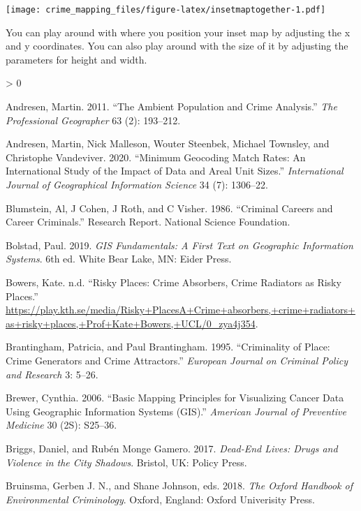 \documentclass[
]{book}
\newlength{\cslhangindent}
\newenvironment{CSLReferences}[2] %
 {%
  \setlength{\parindent}{0pt}
  \ifodd #1 \everypar{\setlength{\hangindent}{\cslhangindent}}\ignorespaces\fi
  \ifnum #2 > 0
  \setlength{\parskip}{#2\baselineskip}
  \fi
 }%
 {}
\begin{document}
\texttt{[image: crime\_mapping\_files/figure-latex/insetmaptogether-1.pdf]}

You can play around with where you position your inset map by adjusting the x and y coordinates. You can also play around with the size of it by adjusting the parameters for height and width.

\hypertarget{refs}{}
\begin{CSLReferences}{1}{0}
\leavevmode\hypertarget{ref-Andresen_2011}{}%
Andresen, Martin. 2011. {``The Ambient Population and Crime Analysis.''} \emph{The Professional Geographer} 63 (2): 193--212.

\leavevmode\hypertarget{ref-Andresen_2020}{}%
Andresen, Martin, Nick Malleson, Wouter Steenbek, Michael Townsley, and Christophe Vandeviver. 2020. {``Minimum Geocoding Match Rates: An International Study of the Impact of Data and Areal Unit Sizes.''} \emph{International Journal of Geographical Information Science} 34 (7): 1306--22.

\leavevmode\hypertarget{ref-Blumstein_1986}{}%
Blumstein, Al, J Cohen, J Roth, and C Visher. 1986. {``Criminal Careers and Career Criminals.''} Research Report. National Science Foundation.

\leavevmode\hypertarget{ref-Bolstad_2019}{}%
Bolstad, Paul. 2019. \emph{GIS Fundamentals: A First Text on Geographic Information Systems}. 6th ed. White Bear Lake, MN: Eider Press.

\leavevmode\hypertarget{ref-Bowers_2021}{}%
Bowers, Kate. n.d. {``Risky Places: Crime Absorbers, Crime Radiators as Risky Places.''} \url{https://play.kth.se/media/Risky+PlacesA+Crime+absorbers,+crime+radiators+as+risky+places,+Prof+Kate+Bowers,+UCL/0_zya4j354}.

\leavevmode\hypertarget{ref-Brantingham_1995}{}%
Brantingham, Patricia, and Paul Brantingham. 1995. {``Criminality of Place: Crime Generators and Crime Attractors.''} \emph{European Journal on Criminal Policy and Research} 3: 5--26.

\leavevmode\hypertarget{ref-Brewer_2006}{}%
Brewer, Cynthia. 2006. {``Basic Mapping Principles for Visualizing Cancer Data Using Geographic Information Systems (GIS).''} \emph{American Journal of Preventive Medicine} 30 (2S): S25--36.

\leavevmode\hypertarget{ref-Briggs_2017}{}%
Briggs, Daniel, and Rubén Monge Gamero. 2017. \emph{Dead-End Lives: Drugs and Violence in the City Shadows}. Bristol, UK: Policy Press.

\leavevmode\hypertarget{ref-Bruinsma_2018}{}%
Bruinsma, Gerben J. N., and Shane Johnson, eds. 2018. \emph{The Oxford Handbook of Environmental Criminology}. Oxford, England: Oxford Univerisity Press.


\end{CSLReferences}
\end{document}
